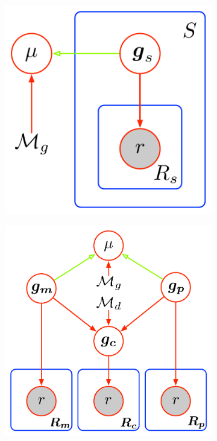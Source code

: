 \documentclass[notitlepage, twocolumn]{article}
\begin{document}
\begin{figure}[ht]
    \centering
    \begin{subfigure}[b]{0.3\textwidth}
        \includegraphics[width=\textwidth]{figures/population_model}
        \caption{}
        \label{fig:pop}
    \end{subfigure}
    \hfill
    \begin{subfigure}[b]{0.3\textwidth}
        \includegraphics[width=\textwidth]{figures/trio_model}

\end{subfigure}
\end{figure}
\end{document}
